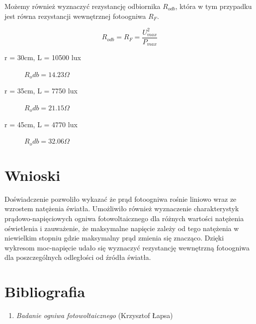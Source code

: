\documentclass[polish, a4paper]{article}
\begin{document}
Możemy również wyznaczyć rezystancję odbiornika $R_{odb}$, która w tym przypadku jest równa rezystancji wewnętrznej fotoogniwa $R_F$.

\begin{equation}
    R_{odb} = R_F = \frac{U_{max}^2}{P_{max}}
\end{equation}

\begin{description}
    \item[r = 30cm, L = 10500 lux]{$R_odb = 14.23 \Omega$}
    \item[r = 35cm, L = 7750 lux]{$R_odb = 21.15 \Omega$}
    \item[r = 45cm, L = 4770 lux]{$R_odb = 32.06 \Omega$}
\end{description}

\section{Wnioski}

Doświadczenie pozwoliło wykazać że prąd fotoogniwa rośnie liniowo wraz ze wzrostem natężenia
światła. Umożliwiło również wyznaczenie charakterystyk prądowo-napięciowych ogniwa fotowoltaicznego dla różnych wartości natężenia oświetlenia i zauważenie, że maksymalne napięcie zależy
od tego natężenia w niewielkim stopniu gdzie maksymalny prąd zmienia się znacząco. Dzięki wykresom moc-napięcie udało się wyznaczyć rezystancję wewnętrzną fotoogniwa dla poszczególnych
odległości od źródła światła.

\section{Bibliografia}

\begin{enumerate}
    \item {\emph{Badanie ogniwa fotowoltaicznego} (Krzysztof Łapsa)}
\end{enumerate}
\end{document}
